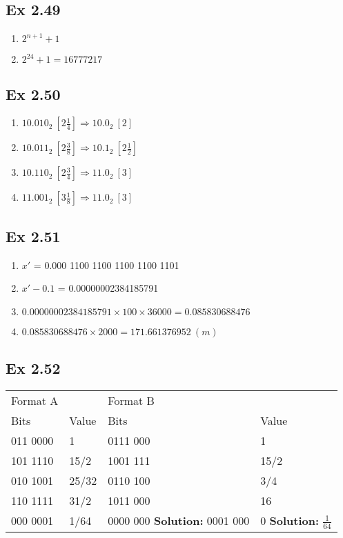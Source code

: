 \subsection{Ex 2.49}
\begin{enumerate}
    \item $2^{n + 1} + 1$
    \item $2^{24} + 1 = 16777217$
\end{enumerate}

\subsection{Ex 2.50}
\begin{enumerate}
    \item $10.010_2\ [2\frac{1}{4}] \Rightarrow 10.0_2\ [2]$
    \item $10.011_2\ [2\frac{3}{8}] \Rightarrow 10.1_2\ [2\frac{1}{2}] $
    \item $10.110_2\ [2\frac{3}{4}] \Rightarrow 11.0_2\ [3]$
    \item $11.001_2\ [3\frac{1}{8}] \Rightarrow 11.0_2\ [3]$
\end{enumerate}

\subsection{Ex 2.51}
\begin{enumerate}
    \item $x'$ = 0.000 1100 1100 1100 1100 1101
    \item $x' - 0.1$ = 0.00000002384185791
    \item $0.00000002384185791 \times 100 \times 36000 = 0.085830688476$
    \item $0.085830688476 \times 2000 = 171.661376952\ (m)$
\end{enumerate}

\subsection{Ex 2.52}
\begin{table}[h]
    \centering
    \begin{tabular}{llll}
        \toprule
        Format A && Format B&\\
        Bits & Value & Bits & Value\\
        \midrule
        011 0000 & 1 & 0111 000 & 1\\
        101 1110 & 15/2 & 1001 111 & 15/2\\
        010 1001 & 25/32 & 0110 100 & 3/4\\
        110 1111 & 31/2 & 1011 000 & 16\\
        000 0001 & 1/64 & 0000 000 {\color{red}\textbf{Solution: }0001 000} & 0 {\color{red}\textbf{Solution: }$\frac{1}{64}$}\\
        \bottomrule
    \end{tabular}
\end{table}

